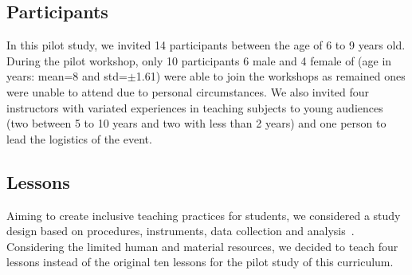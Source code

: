 \documentclass[sigconf,anonymous,review]{acmart}
\begin{document}
\subsection{Participants}
In this pilot study, we invited 14 participants between the age of 6 to 9 years old. 
During the pilot workshop, only 10 participants 6 male and 4 female of (age in years: mean=8 and std=$\pm$1.61) were able to join the workshops as remained ones were unable to attend due to personal circumstances. 
We also invited four instructors with variated experiences in teaching subjects to young audiences (two between 5 to 10 years and two with less than 2 years) and one person to lead the logistics of the event.

\subsection{Lessons}
Aiming to create inclusive teaching practices for students, we considered a study design based on procedures, instruments,  data collection and analysis~\cite{du2022}.
Considering the limited human and material resources, we decided to teach four lessons instead of the original ten lessons for the pilot study of this curriculum.
\end{document}
